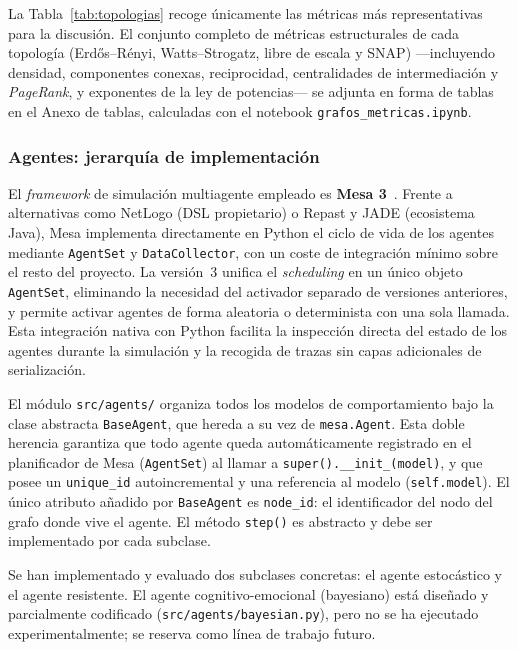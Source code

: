 La Tabla~\ref{tab:topologias} recoge únicamente las métricas más representativas para la discusión. El conjunto completo de métricas estructurales de cada topología (Erdős–Rényi, Watts–Strogatz, libre de escala y SNAP) —incluyendo densidad, componentes conexas, reciprocidad, centralidades de intermediación y \emph{PageRank}, y exponentes de la ley de potencias— se adjunta en forma de tablas en el Anexo de tablas, calculadas con el notebook \texttt{grafos\_metricas.ipynb}.

\subsubsection{Agentes: jerarquía de implementación}

El \textit{framework} de simulación multiagente empleado es \textbf{Mesa 3}~\cite{Mesa3}. Frente a alternativas como NetLogo (DSL propietario) o Repast y JADE (ecosistema Java), Mesa implementa directamente en Python el ciclo de vida de los agentes mediante \texttt{AgentSet} y \texttt{DataCollector}, con un coste de integración mínimo sobre el resto del proyecto. La versión~3 unifica el \textit{scheduling} en un único objeto \texttt{AgentSet}, eliminando la necesidad del activador separado de versiones anteriores, y permite activar agentes de forma aleatoria o determinista con una sola llamada. Esta integración nativa con Python facilita la inspección directa del estado de los agentes durante la simulación y la recogida de trazas sin capas adicionales de serialización.

El módulo \texttt{src/agents/} organiza todos los modelos de comportamiento bajo la clase abstracta \texttt{BaseAgent}, que hereda a su vez de \texttt{mesa.Agent}. Esta doble herencia garantiza que todo agente queda automáticamente registrado en el planificador de Mesa (\texttt{AgentSet}) al llamar a \texttt{super().\_\_init\_(model)}, y que posee un \texttt{unique\_id} autoincremental y una referencia al modelo (\texttt{self.model}). El único atributo añadido por \texttt{BaseAgent} es \texttt{node\_id}: el identificador del nodo del grafo donde vive el agente. El método \texttt{step()} es abstracto y debe ser implementado por cada subclase.

Se han implementado y evaluado dos subclases concretas: el agente estocástico y el agente resistente. El agente cognitivo-emocional (bayesiano) está diseñado y parcialmente codificado (\texttt{src/agents/bayesian.py}), pero no se ha ejecutado experimentalmente; se reserva como línea de trabajo futuro.

